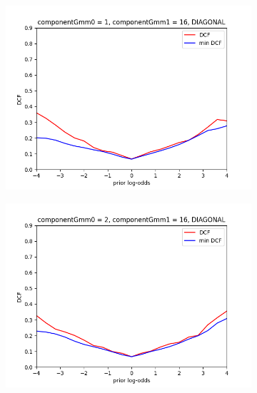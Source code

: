 \begin{figure}[h!]
    \centering
    \begin{subfigure}[b]{0.23\linewidth}
        \includegraphics[width=\linewidth]{Lab/10. Lab 10/Images/07. 1-16 Diag}
        \label{fig:GMM116Diag}
    \end{subfigure}
    \begin{subfigure}[b]{0.23\linewidth}
        \includegraphics[width=\linewidth]{Lab/10. Lab 10/Images/08. 2-16 Diag}
        \label{fig:GMM216Diag}
    \end{subfigure}
    \begin{subfigure}[b]{0.23\linewidth}

\end{subfigure}
\end{figure}
